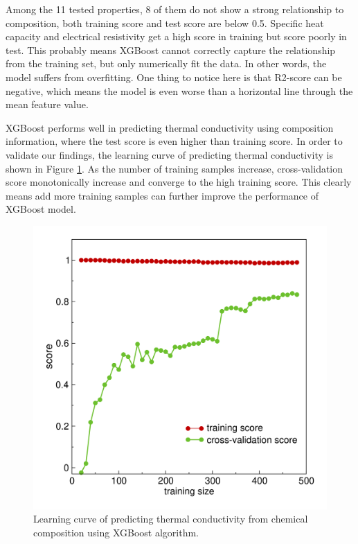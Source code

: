 \documentclass[10pt,aps,prb,amsmath,amssymb,twocolumn,letterpaper,nobalancelastpage,final,citeautoscript,floatfix,raggedbottom,superscriptaddress]{revtex4-1}
\begin{document}
Among the 11 tested properties, 8 of them do not show a strong relationship to composition, both training score and test score are below 0.5. Specific heat capacity and electrical resistivity get a high score in training but score poorly in test. This probably means XGBoost cannot correctly capture the relationship from the training set, but only numerically fit the data. In other words, the model suffers from overfitting. One thing to notice here is that R2-score can be negative, which means the model is even worse than a horizontal line through the mean feature value.

XGBoost performs well in predicting thermal conductivity using composition information, where the test score is even higher than training score. In order to validate our findings, the learning curve of predicting thermal conductivity is shown in Figure \ref{fig:learning_curve}. As the number of training samples increase, cross-validation score monotonically increase and converge to the high training score. This clearly means add more training samples can further improve the performance of XGBoost model.

\begin{figure}[h]
  \center
  \vspace{-1mm}
 \includegraphics[width=0.95\linewidth]{figures/learning_curve.png}
  \caption{Learning curve of predicting thermal conductivity from chemical composition using XGBoost algorithm.}
  \label{fig:learning_curve}
\end{figure}
\end{document}
